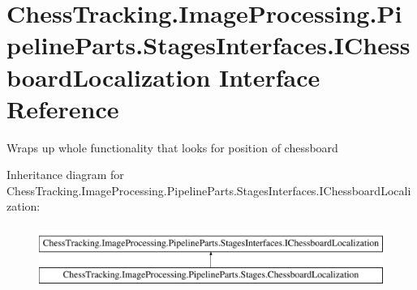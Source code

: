 \hypertarget{interface_chess_tracking_1_1_image_processing_1_1_pipeline_parts_1_1_stages_interfaces_1_1_i_chessboard_localization}{}\section{Chess\+Tracking.\+Image\+Processing.\+Pipeline\+Parts.\+Stages\+Interfaces.\+I\+Chessboard\+Localization Interface Reference}
\label{interface_chess_tracking_1_1_image_processing_1_1_pipeline_parts_1_1_stages_interfaces_1_1_i_chessboard_localization}


Wraps up whole functionality that looks for position of chessboard  


Inheritance diagram for Chess\+Tracking.\+Image\+Processing.\+Pipeline\+Parts.\+Stages\+Interfaces.\+I\+Chessboard\+Localization\+:\begin{figure}[H]
\begin{center}
\leavevmode
\includegraphics[height=2.000000cm]{interface_chess_tracking_1_1_image_processing_1_1_pipeline_parts_1_1_stages_interfaces_1_1_i_chessboard_localization}
\end{center}
\end{figure}
